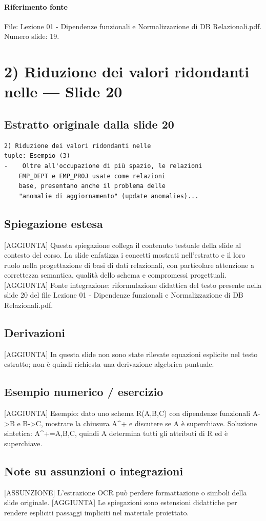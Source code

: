\documentclass[11pt]{article}
\begin{document}
\paragraph{Riferimento fonte} File: Lezione 01 - Dipendenze funzionali e Normalizzazione di DB Relazionali.pdf. Numero slide: 19.
\section{2) Riduzione dei valori ridondanti nelle --- Slide 20}
\subsection*{Estratto originale dalla slide 20}
\begin{lstlisting}
2) Riduzione dei valori ridondanti nelle
tuple: Esempio (3)
-    Oltre all'occupazione di più spazio, le relazioni
    EMP_DEPT e EMP_PROJ usate come relazioni
    base, presentano anche il problema delle
    "anomalie di aggiornamento" (update anomalies)...
\end{lstlisting}
\subsection*{Spiegazione estesa}
[AGGIUNTA] Questa spiegazione collega il contenuto testuale della slide al contesto del corso. La slide enfatizza i concetti mostrati nell'estratto e il loro ruolo nella progettazione di basi di dati relazionali, con particolare attenzione a correttezza semantica, qualità dello schema e compromessi progettuali.
[AGGIUNTA] Fonte integrazione: riformulazione didattica del testo presente nella slide 20 del file Lezione 01 - Dipendenze funzionali e Normalizzazione di DB Relazionali.pdf.
\subsection*{Derivazioni}
[AGGIUNTA] In questa slide non sono state rilevate equazioni esplicite nel testo estratto; non è quindi richiesta una derivazione algebrica puntuale.
\subsection*{Esempio numerico / esercizio}
[AGGIUNTA] Esempio: dato uno schema R(A,B,C) con dipendenze funzionali A->B e B->C, mostrare la chiusura A^+ e discutere se A è superchiave. Soluzione sintetica: A^+={A,B,C}, quindi A determina tutti gli attributi di R ed è superchiave.
\subsection*{Note su assunzioni o integrazioni}
[ASSUNZIONE] L'estrazione OCR può perdere formattazione o simboli della slide originale.
[AGGIUNTA] Le spiegazioni sono estensioni didattiche per rendere espliciti passaggi impliciti nel materiale proiettato.
\end{document}
